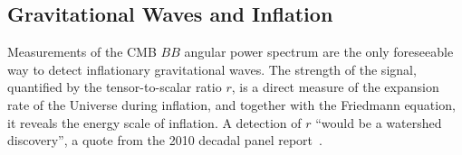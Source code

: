 \documentclass[PICOAPC.tex]{subfiles}
\begin{document}
\subsection{Gravitational Waves and Inflation}
\label{sec:inflation}




Measurements of the \ac{CMB} $BB$ angular power spectrum are the only foreseeable way to detect  inflationary gravitational waves. The strength of the signal, quantified by the tensor-to-scalar ratio $r$, is a direct measure of the expansion rate of the Universe during inflation, and together with the Friedmann equation, it reveals the energy scale of inflation. A detection of $r$  ``would be a watershed discovery'', a quote from the 2010 decadal panel report~\citep{blandford2010}. 
\end{document}
